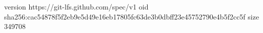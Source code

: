 version https://git-lfs.github.com/spec/v1
oid sha256:cac54878f5f2eb9e5d49e16eb17805fc63de3b0dbff23e45752790e4b5f2cc5f
size 349708
